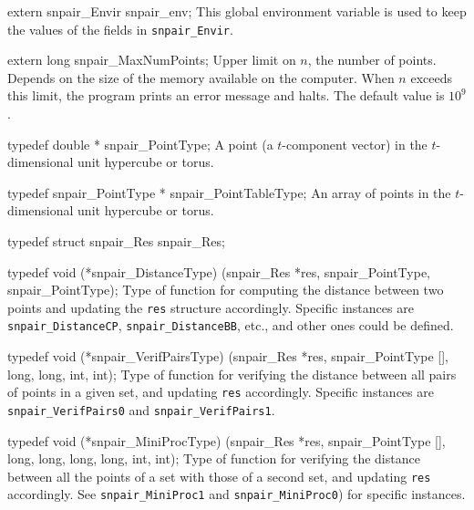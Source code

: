extern snpair_Envir snpair_env;
\endcode
\tab
   This global environment variable is used to keep the values of the fields
   in {\tt snpair\_Envir}.
\endtab
\fi  %
\hide
\code


extern long snpair_MaxNumPoints;
\endcode
 \tab
  Upper limit on $n$, the number of points. Depends on the size of
  the memory available on  the computer.  When $n$ exceeds this limit,
  the program prints  an error message and halts.
  The default value is $10^{9}$.
 \endtab
\endhide

\ifdetailed  %


\code

typedef double * snpair_PointType;
\endcode
 \tab
  A point (a $t$-component vector) in the $t$-dimensional unit hypercube 
  or torus.
 \endtab
\code


typedef snpair_PointType * snpair_PointTableType;
\endcode
 \tab An array of points in the $t$-dimensional unit hypercube or torus.
 \endtab
\fi
\hide %
\code


typedef struct snpair_Res snpair_Res;

typedef void (*snpair_DistanceType) (snpair_Res *res, snpair_PointType,
                                     snpair_PointType);
\endcode
 \tab  Type of function for computing the distance between two points
  and updating the {\tt res} structure accordingly.
  Specific instances are {\tt snpair\_DistanceCP},
  {\tt snpair\_DistanceBB}, etc., and other ones could be defined.
 \endtab
\code


typedef void (*snpair_VerifPairsType) (snpair_Res *res, snpair_PointType [],
                                       long, long, int, int);
\endcode
 \tab  Type of function for verifying the distance between all pairs 
  of points in a given set, and updating {\tt res} accordingly.
  Specific instances are {\tt snpair\_VerifPairs0} and 
  {\tt snpair\_VerifPairs1}.
 \endtab
\code


typedef void (*snpair_MiniProcType) (snpair_Res *res, snpair_PointType [],
                                     long, long, long, long, int, int);
\endcode
 \tab  Type of function for verifying the distance between all the 
  points of a set with those of a second set, and updating {\tt res}
  accordingly.  See {\tt snpair\_MiniProc1} and {\tt snpair\_MiniProc0})
  for specific instances.
 \endtab
\endhide %

\ifdetailed  %
\code


